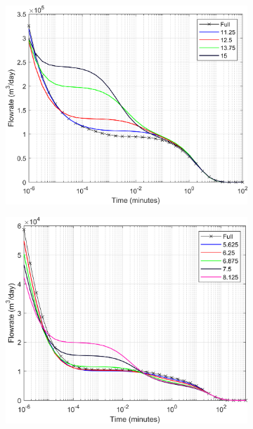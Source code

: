 \documentclass[Supplementary.tex]{subfiles}
\begin{document}
\begin{figure}[ht]
\begin{subfigure}{0.3\textwidth}
        \label{fig:3D_DD_6}
     \end{subfigure}
     \\
     \begin{subfigure}{0.3\textwidth}
        \includegraphics[width=\textwidth]{3D_DD/Plot_Drawdown_Case_07_nohead.png}
        \label{fig:3D_DD_7}
     \end{subfigure}
     \begin{subfigure}{0.3\textwidth}
        \includegraphics[width=\textwidth]{3D_DD/Plot_Drawdown_Case_08_nohead.png}

\end{subfigure}
\end{figure}
\end{document}
